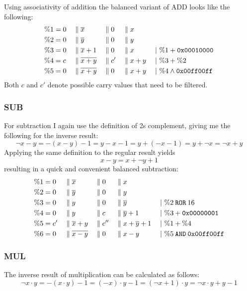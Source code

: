 Using associativity of addition the balanced variant of ADD looks like the following:
\begin{align*}
  \%1 &= 0 && \; \| \; \overline{x} &&\; \| \; 0 &&\; \| \; x      &&\\
  \%2 &= 0 && \; \| \; \overline{y} &&\; \| \; 0 &&\; \| \; y      &&\\
  \%3 &= 0 && \; \| \; \overline{x}+1 &&\; \| \; 0 &&\; \| \; x    &&\;|\ \%1 + \texttt{0x00010000}\\
  \%4 &= c && \; \| \; \overline{x+y} &&\; \| \; c' &&\; \| \; x+y &&\;|\ \%3 + \%2\\
  \%5 &= 0 && \; \| \; \overline{x+y} &&\; \| \; 0 &&\; \| \; x+y  &&\;|\ \%4 \land \texttt{0x00ff00ff}
\end{align*}
Both $c$ and $c'$ denote possible carry values that need to be filtered.

\subsubsection{SUB}
For subtraction I again use the definition of 2s complement, giving me the following for the inverse result:
\begin{equation*}
  \neg{x-y} = - (x-y) - 1 = y - x - 1 = y + (-x -1) = y + \neg{x} = \neg{x} + y
\end{equation*}
Applying the same definition to the regular result yields
\begin{equation*}
  x-y = x + \neg{y} + 1
\end{equation*}
resulting in a quick and convenient balanced subtraction:
\begin{align*}
  \%1 &= 0 &&\; \| \; \overline{x} &&\; \| \; 0 &&\; \| \; x &&\\
  \%2 &= 0 &&\; \| \; \overline{y} &&\; \| \; 0 &&\; \| \; y &&\\
  \%3 &= 0 &&\; \| \; y &&\; \| \; 0 &&\; \| \; \overline{y} && \;|\ \%2 \mathbin{\texttt{ROR}} 16\\
  \%4 &= 0 &&\; \| \; y &&\; \| \; c &&\; \| \; \overline{y}+1 && \;|\ \%3 + \texttt{0x00000001}\\
  \%5 &= c' &&\; \| \; \overline{x}+y &&\; \| \; c'' &&\; \| \; x+\overline{y}+1 && \;|\ \%1 + \%4\\
  \%6 &= 0 &&\; \| \; \overline{x-y} &&\; \| \; 0 &&\; \| \; x-y && \;|\ \%5 \mathbin{\texttt{AND}} \texttt{0x00ff00ff}
\end{align*}

\subsubsection{MUL}
The inverse result of multiplication can be calculated as follows:
\begin{equation*}
  \neg{x \cdot y} = -(x \cdot y) - 1 = (-x) \cdot y - 1 = (\neg{x} + 1) \cdot y = \neg{x} \cdot y + y - 1
\end{equation*}

